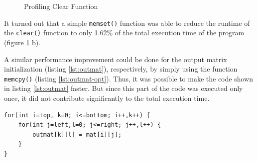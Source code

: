 \documentclass[conference]{IEEEtran}
\begin{document}
\begin{figure}[h]
  \centering
  \quad
  \caption{Profiling Clear Function}
  \label{pic:clear}
\end{figure}

It turned out that a simple \texttt{memset()} function was able to reduce the runtime of the \texttt{clear()} function to only 1.62\% of the total execution time of the program (figure \ref{pic:clear} b).

A similar performance improvement could be done for the output matrix initialization (listing \ref{lst:outmat}), respectively, by simply using the function \texttt{memcpy()} (listing \ref{lst:outmat-opt}). Thus, it was possible to make the code shown in listing \ref{lst:outmat} faster. But since this part of the code was executed only once, it did not contribute significantly to the total execution time. 

\begin{center}
   \begin{lstlisting}[captionpos=b, caption=Initial Implementation: Initialize Output Matrix, label=lst:outmat]
for(int i=top, k=0; i<=bottom; i++,k++) {     
    for(int j=left,l=0; j<=right; j++,l++) {
        outmat[k][l] = mat[i][j];              
    }                                          
}                                              
   \end{lstlisting}
\end{center}
\end{document}
